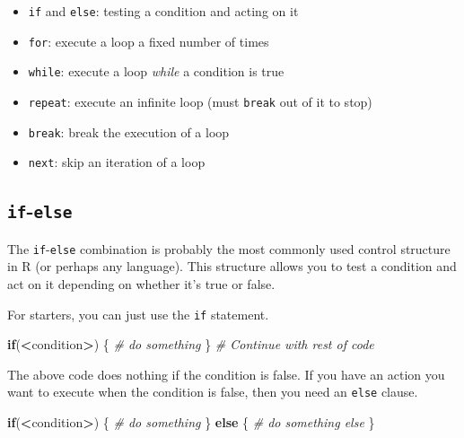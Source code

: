 \documentclass[]{book}
\newenvironment{Shaded}{\begin{snugshade}}{\end{snugshade}}
\newcommand{\CommentTok}[1]{\textcolor[rgb]{0.56,0.35,0.01}{\textit{#1}}}
\newcommand{\ControlFlowTok}[1]{\textcolor[rgb]{0.13,0.29,0.53}{\textbf{#1}}}
\newcommand{\OperatorTok}[1]{\textcolor[rgb]{0.81,0.36,0.00}{\textbf{#1}}}
\newcommand{\NormalTok}[1]{#1}
\theoremstyle{definition}
\theoremstyle{definition}
\theoremstyle{definition}
\theoremstyle{remark}
\begin{document}
\begin{itemize}
\item
  \texttt{if} and \texttt{else}: testing a condition and acting on it
\item
  \texttt{for}: execute a loop a fixed number of times
\item
  \texttt{while}: execute a loop \emph{while} a condition is true
\item
  \texttt{repeat}: execute an infinite loop (must \texttt{break} out of
  it to stop)
\item
  \texttt{break}: break the execution of a loop
\item
  \texttt{next}: skip an iteration of a loop
\end{itemize}

\subsection{\texorpdfstring{\texttt{if}-\texttt{else}}{if-else}}\label{if-else}

The \texttt{if}-\texttt{else} combination is probably the most commonly
used control structure in R (or perhaps any language). This structure
allows you to test a condition and act on it depending on whether it's
true or false.

For starters, you can just use the \texttt{if} statement.

\begin{Shaded}
\begin{Highlighting}[]
\ControlFlowTok{if}\NormalTok{(}\OperatorTok{<}\NormalTok{condition}\OperatorTok{>}\NormalTok{) \{}
        \CommentTok{# do something}
\NormalTok{\} }
\CommentTok{# Continue with rest of code}
\end{Highlighting}
\end{Shaded}

The above code does nothing if the condition is false. If you have an
action you want to execute when the condition is false, then you need an
\texttt{else} clause.

\begin{Shaded}
\begin{Highlighting}[]
\ControlFlowTok{if}\NormalTok{(}\OperatorTok{<}\NormalTok{condition}\OperatorTok{>}\NormalTok{) \{}
        \CommentTok{# do something}
\NormalTok{\} }
\ControlFlowTok{else}\NormalTok{ \{}
        \CommentTok{# do something else}
\NormalTok{\}}
\end{Highlighting}
\end{Shaded}
\end{document}
